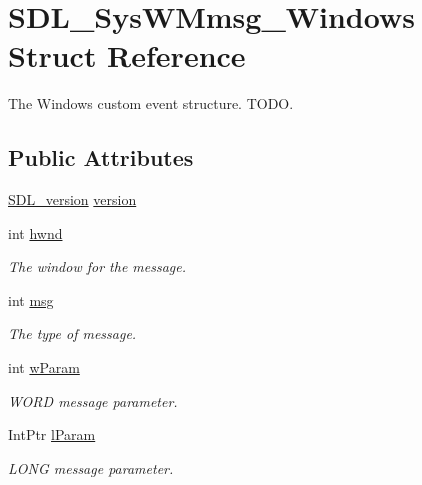 \hypertarget{struct_s_d_l___sys_w_mmsg___windows}{
\section{SDL\_\-SysWMmsg\_\-Windows Struct Reference}
\label{struct_s_d_l___sys_w_mmsg___windows}
}


The Windows custom event structure. TODO.  


\subsection*{Public Attributes}
\begin{DoxyCompactItemize}
\item 
\hyperlink{struct_s_d_l__version}{SDL\_\-version} \hyperlink{struct_s_d_l___sys_w_mmsg___windows_ab7a3fd3021228a2aada9aa5611340660}{version}
\item 
int \hyperlink{struct_s_d_l___sys_w_mmsg___windows_a197fcf1eff43c69746d9df7dfcc86acf}{hwnd}
\begin{DoxyCompactList}\small\item\em The window for the message. \item\end{DoxyCompactList}\item 
int \hyperlink{struct_s_d_l___sys_w_mmsg___windows_aa1f227c29c7df1e3d1585e79911c5c12}{msg}
\begin{DoxyCompactList}\small\item\em The type of message. \item\end{DoxyCompactList}\item 
int \hyperlink{struct_s_d_l___sys_w_mmsg___windows_abdcc59f9c5289bf0b18c42902bf43406}{wParam}
\begin{DoxyCompactList}\small\item\em WORD message parameter. \item\end{DoxyCompactList}\item 
IntPtr \hyperlink{struct_s_d_l___sys_w_mmsg___windows_a25b6bfe58d3358a1415854c4eea4c38f}{lParam}
\begin{DoxyCompactList}\small\item\em LONG message parameter. \item\end{DoxyCompactList}\end{DoxyCompactItemize}


